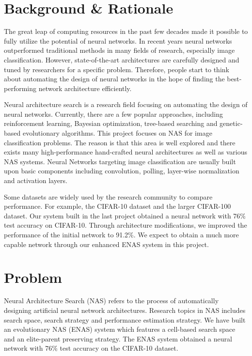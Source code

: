\documentclass{article}
\begin{document}
   \begin{normalsize}
   
     
     
   \section{Background \& Rationale}
       
     The great leap of computing resources in the past few decades made it possible to fully utilize the potential of neural networks. In recent years neural networks outperformed traditional methods in many fields of research, especially image classification. However, state-of-the-art architectures are carefully designed and tuned by researchers for a specific problem. Therefore, people start to think about automating the design of neural networks in the hope of finding the best-performing network architecture efficiently.

     Neural architecture search is a research field focusing on automating the design of neural networks. Currently, there are a few popular approaches, including reinforcement learning, Bayesian optimization, tree-based searching and genetic-based evolutionary algorithms. This project focuses on NAS for image classification problems. The reason is that this area is well explored and there exists many high-performance hand-crafted neural architectures as well as various NAS systems. Neural Networks targeting image classification are usually built upon basic components including convolution, polling, layer-wise normalization and activation layers. 
     
     Some datasets are widely used by the research community to compare performance. For example, the CIFAR-10 dataset and the larger CIFAR-100 dataset.
     Our system built in the last project obtained a neural network with 76\% test accuracy on CIFAR-10. Through architecture modifications, we improved the performance of the initial network to 91.2\%. We expect to obtain a much more capable network through our enhanced ENAS system in this project.
   \section{Problem}
     Neural Architecture Search (NAS) refers to the process of automatically designing artificial neural network architectures\cite{elsken2018neural}. Research topics in NAS  includes search space, search strategy and performance estimation strategy. We have built an evolutionary NAS (ENAS) system which features a cell-based search space and an elite-parent preserving strategy. The ENAS system obtained a neural network with 76\% test accuracy on the CIFAR-10 dataset. 
     

\end{normalsize}
\end{document}

